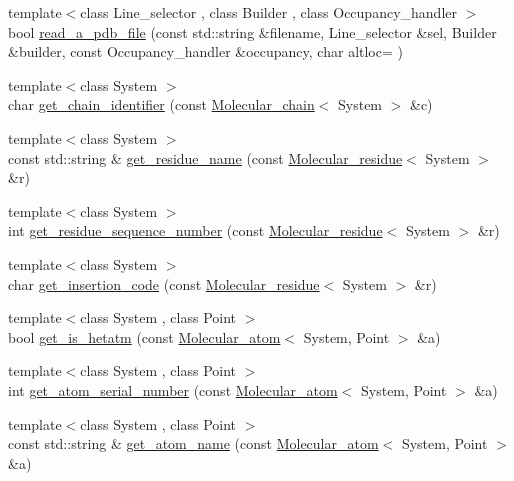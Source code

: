 \begin{DoxyCompactItemize}
\item 
{\footnotesize template$<$class Line\+\_\+selector , class Builder , class Occupancy\+\_\+handler $>$ }\\bool \hyperlink{namespaceESBTL_a28936dc2a8755e244e063f40553c1b71}{read\+\_\+a\+\_\+pdb\+\_\+file} (const std\+::string \&filename, Line\+\_\+selector \&sel, Builder \&builder, const Occupancy\+\_\+handler \&occupancy, char altloc=\textquotesingle{} \textquotesingle{})
\item 
{\footnotesize template$<$class System $>$ }\\char \hyperlink{namespaceESBTL_a77317a847ab3d5ed38cf42b4b7508539}{get\+\_\+chain\+\_\+identifier} (const \hyperlink{classESBTL_1_1Molecular__chain}{Molecular\+\_\+chain}$<$ System $>$ \&c)
\item 
{\footnotesize template$<$class System $>$ }\\const std\+::string \& \hyperlink{namespaceESBTL_ac67e09aee9aee533dd3953a094a52516}{get\+\_\+residue\+\_\+name} (const \hyperlink{classESBTL_1_1Molecular__residue}{Molecular\+\_\+residue}$<$ System $>$ \&r)
\item 
{\footnotesize template$<$class System $>$ }\\int \hyperlink{namespaceESBTL_a2531b710e918b38251babbd95179816a}{get\+\_\+residue\+\_\+sequence\+\_\+number} (const \hyperlink{classESBTL_1_1Molecular__residue}{Molecular\+\_\+residue}$<$ System $>$ \&r)
\item 
{\footnotesize template$<$class System $>$ }\\char \hyperlink{namespaceESBTL_a0cb3d5a589b11f0a75373bbaaf19b45a}{get\+\_\+insertion\+\_\+code} (const \hyperlink{classESBTL_1_1Molecular__residue}{Molecular\+\_\+residue}$<$ System $>$ \&r)
\item 
{\footnotesize template$<$class System , class Point $>$ }\\bool \hyperlink{namespaceESBTL_a5127b779bbb76916a99d85f2ae7d5ff8}{get\+\_\+is\+\_\+hetatm} (const \hyperlink{classESBTL_1_1Molecular__atom}{Molecular\+\_\+atom}$<$ System, Point $>$ \&a)
\item 
{\footnotesize template$<$class System , class Point $>$ }\\int \hyperlink{namespaceESBTL_ac59c723bd1e61d82a0ddbc5a08d63b50}{get\+\_\+atom\+\_\+serial\+\_\+number} (const \hyperlink{classESBTL_1_1Molecular__atom}{Molecular\+\_\+atom}$<$ System, Point $>$ \&a)
\item 
{\footnotesize template$<$class System , class Point $>$ }\\const std\+::string \& \hyperlink{namespaceESBTL_a2a0153bcc07ae7f992d0087ea0574b2a}{get\+\_\+atom\+\_\+name} (const \hyperlink{classESBTL_1_1Molecular__atom}{Molecular\+\_\+atom}$<$ System, Point $>$ \&a)

\end{DoxyCompactItemize}
